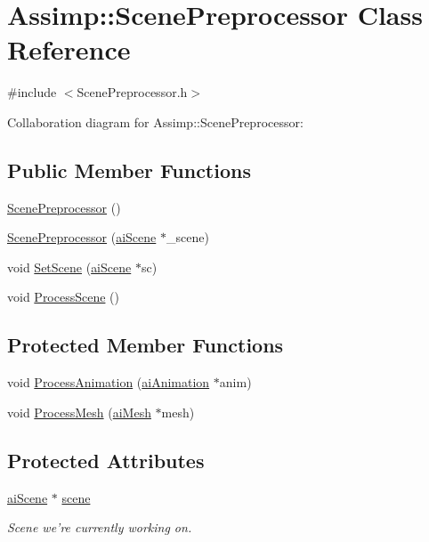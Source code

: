 \hypertarget{class_assimp_1_1_scene_preprocessor}{\section{Assimp\+:\+:Scene\+Preprocessor Class Reference}
\label{class_assimp_1_1_scene_preprocessor}
}


{\ttfamily \#include $<$Scene\+Preprocessor.\+h$>$}



Collaboration diagram for Assimp\+:\+:Scene\+Preprocessor\+:
\subsection*{Public Member Functions}
\begin{DoxyCompactItemize}
\item 
\hyperlink{class_assimp_1_1_scene_preprocessor_ab115153c8601d5003edc05a5d7c0e384}{Scene\+Preprocessor} ()
\item 
\hyperlink{class_assimp_1_1_scene_preprocessor_a55b78e2359e988f6c4b2340aef961fdb}{Scene\+Preprocessor} (\hyperlink{structai_scene}{ai\+Scene} $\ast$\+\_\+scene)
\item 
void \hyperlink{class_assimp_1_1_scene_preprocessor_a8759d84f8d8256dcd65fc213d3e34643}{Set\+Scene} (\hyperlink{structai_scene}{ai\+Scene} $\ast$sc)
\item 
void \hyperlink{class_assimp_1_1_scene_preprocessor_a59ff27f974822fb5ed7b4c66a2649ffb}{Process\+Scene} ()
\end{DoxyCompactItemize}
\subsection*{Protected Member Functions}
\begin{DoxyCompactItemize}
\item 
void \hyperlink{class_assimp_1_1_scene_preprocessor_aae45d1d539fa3c34ea2cc443bd80e6a6}{Process\+Animation} (\hyperlink{structai_animation}{ai\+Animation} $\ast$anim)
\item 
void \hyperlink{class_assimp_1_1_scene_preprocessor_abeccb6d0df888ee8721f95ed513a1676}{Process\+Mesh} (\hyperlink{structai_mesh}{ai\+Mesh} $\ast$mesh)
\end{DoxyCompactItemize}
\subsection*{Protected Attributes}
\begin{DoxyCompactItemize}
\item 
\hypertarget{class_assimp_1_1_scene_preprocessor_ae77827b718185fc0e3509cbae4247c79}{\hyperlink{structai_scene}{ai\+Scene} $\ast$ \hyperlink{class_assimp_1_1_scene_preprocessor_ae77827b718185fc0e3509cbae4247c79}{scene}}\label{class_assimp_1_1_scene_preprocessor_ae77827b718185fc0e3509cbae4247c79}

\begin{DoxyCompactList}\small\item\em Scene we're currently working on. \end{DoxyCompactList}\end{DoxyCompactItemize}
